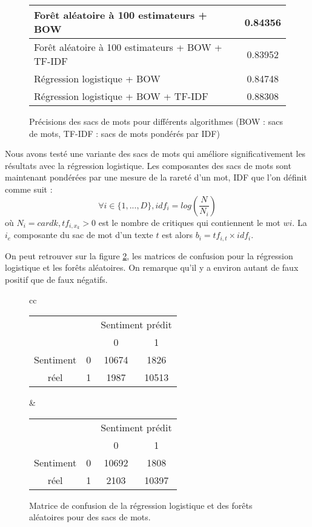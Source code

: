 \documentclass{article}
\begin{document}
\begin{figure}
\begin{center}
\begin{tabular}{|l|c|}
	\hline
	Forêt aléatoire à 100 estimateurs + BOW & 0.84356 \\
	\hline
	Forêt aléatoire à 100 estimateurs + BOW + TF-IDF & 0.83952 \\
	\hline
	Régression logistique + BOW & 0.84748 \\
	\hline
	Régression logistique + BOW + TF-IDF & 0.88308 \\
	\hline
\end{tabular}
\caption{Précisions des sacs de mots pour différents algorithmes (BOW : sacs de mots, TF-IDF : sacs de mots pondérés par IDF)}
\label{results_bow}
\end{center}
\end{figure}

Nous avons testé une variante des sacs de mots qui améliore significativement les résultats avec la régression logistique. Les composantes des sacs de mots sont maintenant pondérées par une mesure de la rareté d'un mot, IDF \cite{Salton:1986:IMI:576628} que l'on définit comme suit :
$$
\forall i \in \{1, ..., D\}, idf_{i} = log(\frac{N}{N_{i}})
$$
où $N_{i} = card{k, tf_{i, x_{k}} > 0}$ est le nombre de critiques qui contiennent le mot $w{i}$. La $i_{e}$ composante du sac de mot d'un texte $t$ est alors $b_{i} = tf_{i,t} \times idf_{i}$. 

On peut retrouver sur la figure \ref{confusion_matrices_bow}, les matrices de confusion pour la régression logistique et les forêts aléatoires. On remarque qu'il y a environ autant de faux positif que de faux négatifs.

\begin{figure}
\begin{center}
\begin{tabular}{cc}
\begin{tabular}{|c|c|c|c|}
   \hline
   \multicolumn{2}{|c|}{} & \multicolumn{2}{c|}{Sentiment prédit} \\
   \cline{3-4}
   \multicolumn{2}{|c|}{} & 0     & 1 \\
   \hline
   Sentiment          & 0 & 10674 & 1826 \\
   \cline{2-4}
   réel               & 1 & 1987  & 10513 \\
   \hline
\end{tabular} &
\begin{tabular}{|c|c|c|c|}
   \hline
   \multicolumn{2}{|c|}{} & \multicolumn{2}{c|}{Sentiment prédit} \\
   \cline{3-4}
   \multicolumn{2}{|c|}{} & 0     & 1 \\
   \hline
   Sentiment          & 0 & 10692 & 1808 \\
   \cline{2-4}
   réel               & 1 & 2103  & 10397 \\
   \hline
\end{tabular}
\end{tabular}
\end{center}
\caption{Matrice de confusion de la régression logistique et des forêts aléatoires pour des sacs de mots.}
\label{confusion_matrices_bow}
\end{figure}
\end{document}
